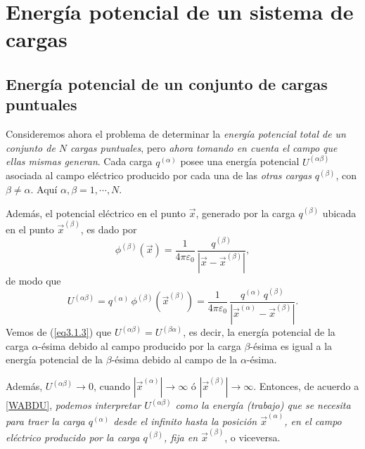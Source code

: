 \section{Energía potencial de un sistema de cargas}  \label{ed3_1}

\subsection{Energía potencial de un conjunto de cargas puntuales}
\label{ed3_1_1}

Consideremos ahora el problema de determinar la \textit{energía potencial total de un
conjunto de $N$ cargas puntuales}, pero \textit{ahora tomando en cuenta el campo que ellas mismas generan}. Cada carga $q^{(\alpha)}$ posee una energía
potencial $U^{(\alpha\beta)}$ asociada al campo eléctrico producido por cada una de las \textit{otras cargas}  $q^{(\beta)}$, con $\beta\ne \alpha$. Aquí $\alpha,\beta=1,\cdots, N$.

Además, el potencial eléctrico en el punto $\vec{x}$, generado por la carga $q^{(\beta)}$
ubicada en el punto $\vec{x}^{(\beta)}$, es dado por
\begin{equation}
\phi^{(\beta)}(\vec{x})=\frac{1}{4\pi\varepsilon_0}\,\frac{q^{(\beta)}}{|\vec{x}
-\vec{x}^{(\beta)}|} ,
\end{equation}
de modo que
\begin{equation} \label{eq3.1.3}
U^{(\alpha\beta)}=q^{(\alpha)}\,\phi^{(\beta)}(\vec{x}^{(\beta)})=\frac{1}{4\pi\varepsilon_0}\,\frac{q^{(\alpha)}\,q^{(\beta)}}{|\vec{x}^{(\alpha)}-\vec{x}^{(\beta)}|}.
\end{equation}
Vemos de (\ref{eq3.1.3}) que $U^{(\alpha\beta)}=U^{(\beta\alpha)}$, es decir, la energía potencial de la carga $\alpha$-ésima debido al campo producido por la carga
$\beta$-ésima es igual a la energía potencial de la $\beta$-ésima debido al campo
de la $\alpha$-ésima.

Además,  $U^{(\alpha\beta)}\to 0$, cuando  $|\vec{x}^{(\alpha)}|\to\infty$
ó $|\vec{x}^{(\beta)}|\to\infty$. Entonces, de acuerdo a \eqref{WABDU}, \textit{podemos interpretar $U^{(\alpha\beta)}$ como la energía (trabajo) que se necesita para traer la carga
$q^{(\alpha)}$ desde el infinito hasta la posición $\vec{x}^{(\alpha)}$, en el campo
eléctrico producido por la carga $q^{(\beta)}$, fija en $\vec{x}^{(\beta)}$}, o
viceversa.


